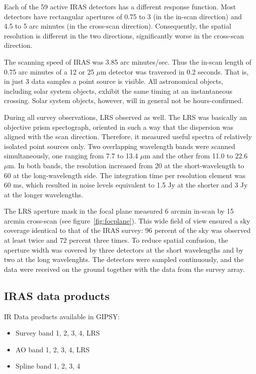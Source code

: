 Each of the 59 active IRAS detectors has a different response function. 
Most detectors have rectangular apertures of 0.75 to 3 (in the in-scan
direction) and 4.5 to 5 arc minutes (in the cross-scan direction). 
Consequently, the spatial resolution is different in the two directions,
significantly worse in the cross-scan direction. 

The scanning speed of IRAS was 3.85 arc minutes/sec.  Thus the in-scan
length of 0.75 arc minutes of a 12 or 25 $\mu$m detector was traversed
in 0.2 seconds.  That is, in just 3 data samples a point source is
visible.  All astronomical objects, including solar system objects,
exhibit the same timing at an instantaneous crossing.  Solar system
objects, however, will in general not be hours-confirmed. 

During all survey observations, LRS observed as well.  The LRS was
basically an objective prism spectograph, oriented in such a way that
the dispersion was aligned with the scan direction.  Therefore, it
measured useful spectra of relatively isolated point sources only.  Two
overlapping wavelength bands were scanned simultaneously, one ranging
from 7.7 to 13.4 $\mu$m and the other from 11.0 to 22.6 $\mu$m.  In both
bands, the resolution increased from 20 at the short-wavelength to 60 at
the long-wavelength side.  The integration time per resolution element
was 60 ms, which resulted in noise levels equivalent to 1.5 Jy at the
shorter and 3 Jy at the longer wavelengths. 

The LRS aperture mask in the focal plane measured 6 arcmin in-scan by 15
arcmin cross-scan (see figure~\ref{fig:focplane}).  This wide field of
view ensured a sky coverage identical to that of the IRAS survey: 96
percent of the sky was observed at least twice and 72 percent three
times.  To reduce spatial confusion, the aperture width was covered by
three detectors at the short wavelengths and by two at the long
wavelenghts.  The detectors were sampled continuously, and the data were
received on the ground together with the data from the survey array. 

\subsection{IRAS data products}

IR Data products available in GIPSY:

\begin{itemize}

\item Survey band 1, 2, 3, 4, LRS

\item AO band 1, 2, 3, 4, LRS

\item Spline band 1, 2, 3, 4

\end{itemize}

